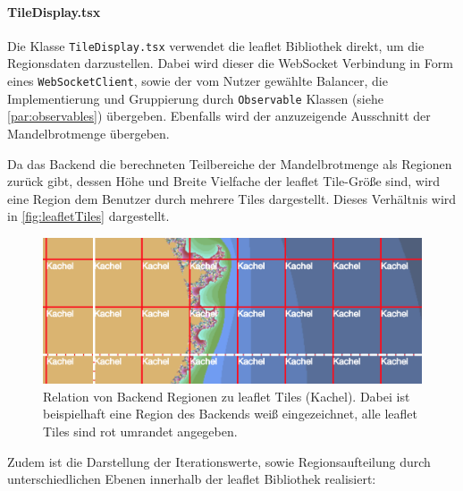 \paragraph{TileDisplay.tsx}
Die Klasse \verb|TileDisplay.tsx| verwendet die leaflet Bibliothek direkt, um die Regionsdaten darzustellen.
Dabei wird dieser die WebSocket Verbindung in Form eines \verb|WebSocketClient|, sowie der vom Nutzer gewählte Balancer,
die Implementierung und Gruppierung durch \verb|Observable| Klassen (siehe \autoref{par:observables}) übergeben. Ebenfalls wird der anzuzeigende Ausschnitt der
Mandelbrotmenge übergeben.

Da das Backend die berechneten Teilbereiche der Mandelbrotmenge als Regionen zurück gibt, dessen Höhe und Breite
Vielfache der leaflet Tile-Größe sind, wird eine Region dem Benutzer durch mehrere Tiles dargestellt.
Dieses Verhältnis wird in \autoref{fig:leafletTiles} dargestellt.

\begin{figure}
	\centering
	\includegraphics[width=0.5\linewidth]{img/Implementierung/leafletTiles}
	\caption{Relation von Backend Regionen zu leaflet Tiles (Kachel).
		Dabei ist beispielhaft eine Region des Backends
		weiß eingezeichnet, alle leaflet Tiles sind rot umrandet angegeben.
	}\label{fig:leafletTiles}
\end{figure}

Zudem ist die Darstellung der Iterationswerte, sowie Regionsaufteilung durch unterschiedlichen Ebenen innerhalb der
leaflet Bibliothek realisiert:

